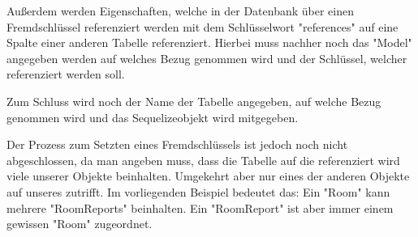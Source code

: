 Außerdem werden Eigenschaften, welche in der Datenbank über einen Fremdschlüssel referenziert werden mit dem Schlüsselwort "references" auf eine Spalte einer anderen Tabelle referenziert. Hierbei muss nachher noch das "Model" angegeben werden auf welches Bezug genommen wird und der Schlüssel, welcher referenziert werden soll.

Zum Schluss wird noch der Name der Tabelle angegeben, auf welche Bezug genommen wird und das Sequelizeobjekt wird mitgegeben.


Der Prozess zum Setzten eines Fremdschlüssels ist jedoch noch nicht abgeschlossen, da man angeben muss, dass die Tabelle auf die referenziert wird viele unserer Objekte beinhalten. Umgekehrt aber nur eines der anderen Objekte auf unseres zutrifft. Im vorliegenden Beispiel bedeutet das: Ein "Room" kann mehrere "RoomReports" beinhalten. Ein "RoomReport" ist aber immer einem gewissen "Room" zugeordnet.



